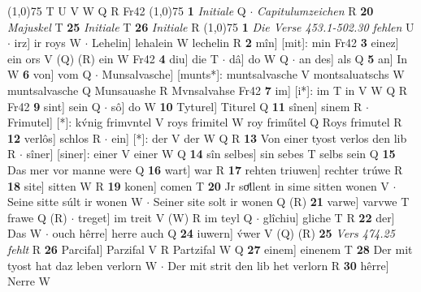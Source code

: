 \documentclass[8pt,a4paper,notitlepage]{article}
\begin{document}
\begin{table}[ht]
\begin{minipage}[t]{0.5\linewidth}
\begin{tabular}{rl}
\end{tabular}
\scriptsize
\line(1,0){75} \newline
T U V W Q R Fr42 \newline
\line(1,0){75} \newline
\textbf{1} \textit{Initiale} Q   $\cdot$ \textit{Capitulumzeichen} R  \textbf{20} \textit{Majuskel} T  \textbf{25} \textit{Initiale} T  \textbf{26} \textit{Initiale} R  \newline
\line(1,0){75} \newline
\textbf{1} \textit{Die Verse 453.1-502.30 fehlen} U   $\cdot$ irz] ir roys W  $\cdot$ Lehelin] lehalein W lechelin R \textbf{2} mîn] [mit]: min Fr42 \textbf{3} einez] ein ors V (Q) (R) ein W Fr42 \textbf{4} diu] die T  $\cdot$ dâ] do W Q  $\cdot$ an des] als Q \textbf{5} an] In W \textbf{6} von] vom Q  $\cdot$ Munsalvasche] [munts*]: muntsalvasche V montsaluatschs W muntsalvasche Q Munsauashe R Mvnsalvahse Fr42 \textbf{7} im] [i*]: im T in V W Q R Fr42 \textbf{9} sint] sein Q  $\cdot$ sô] do W \textbf{10} Tyturel] Titurel Q \textbf{11} sînen] sinem R  $\cdot$ Frimutel] [*]: kv́nig frimvntel V roys frimitel W roy friműtel Q Roys frimutel R \textbf{12} verlôs] schlos R  $\cdot$ ein] [*]: der V der W Q R \textbf{13} Von einer tyost verlos den lib R  $\cdot$ sîner] [siner]: einer V einer W Q \textbf{14} sîn selbes] sin sebes T selbs sein Q \textbf{15} Das mer vor manne were Q \textbf{16} wart] war R \textbf{17} rehten triuwen] rechter trúwe R \textbf{18} site] sitten W R \textbf{19} konen] comen T \textbf{20} Jr soͤllent in sime sitten wonen V  $\cdot$ Seine sitte súlt ir wonen W  $\cdot$ Seiner site solt ir wonen Q (R) \textbf{21} varwe] varvwe T frawe Q (R)  $\cdot$ treget] im treit V (W) R im teyl Q  $\cdot$ glîchiu] gliche T R \textbf{22} der] Das W  $\cdot$ ouch hêrre] herre auch Q \textbf{24} iuwern] v́wer V (Q) (R) \textbf{25} \textit{Vers 474.25 fehlt} R  \textbf{26} Parcifal] Parzifal V R Partzifal W Q \textbf{27} einem] einenem T \textbf{28} Der mit tyost hat daz leben verlorn W  $\cdot$ Der mit strit den lib het verlorn R \textbf{30} hêrre] Nerre W \newline
\end{minipage}
\end{table}
\end{document}
